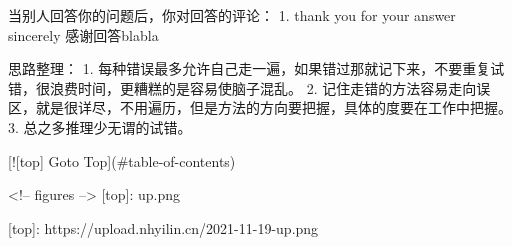 当别人回答你的问题后，你对回答的评论：
1. thank you for your answer sincerely 感谢回答blabla

思路整理：
1. 每种错误最多允许自己走一遍，如果错过那就记下来，不要重复试错，很浪费时间，更糟糕的是容易使脑子混乱。
2. 记住走错的方法容易走向误区，就是很详尽，不用遍历，但是方法的方向要把握，具体的度要在工作中把握。
3. 总之多推理少无谓的试错。

[![top] Goto Top](#table-of-contents)







<!-- figures -->
[top]: up.png

[top]: https://upload.nhyilin.cn/2021-11-19-up.png

